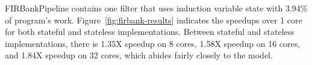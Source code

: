 FIRBankPipeline contains one filter that uses induction variable state with 3.94\% of program's work.   Figure~\ref{fig:firbank-results} indicates the speedups over 1 core for both stateful and stateless implementations.  Between stateful and stateless implementations, there is 1.35X speedup on 8 cores, 1.58X speedup on 16 cores, and 1.84X speedup on 32 cores, which abides fairly closely to the model.